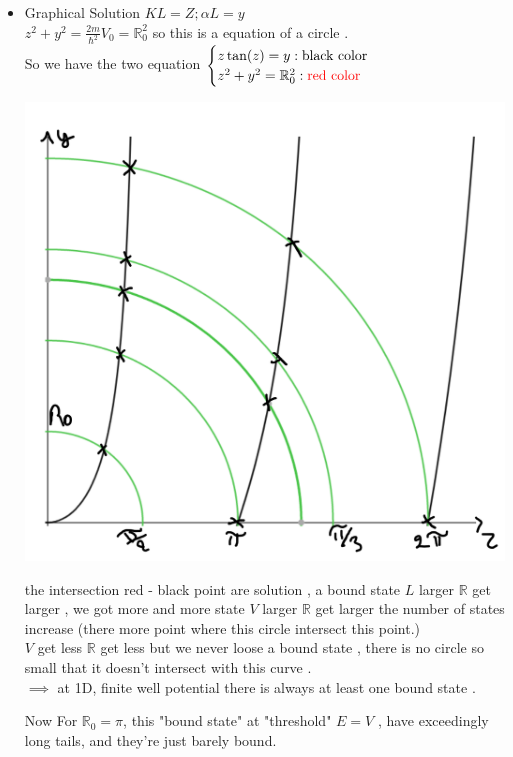 \documentclass[12pt,oneside]{book}
\begin{document}
\begin{itemize}
		\item Graphical Solution $KL = Z ; \alpha L = y$\\
			$z^2 + y^2 = \frac{2m}{\hbar^2}V_0 = \mathbb{R}_0^2$ so this is a equation of a circle . \\
			So we have the two equation $\begin{cases}
				z\tan(z) = y : \text{\textcolor{black}{black color}}\\
				z^2 + y^2 = \mathbb{R}_0^2 : \text{\textcolor{red}{red color}}
			\end{cases}$
			\begin{center}
				\includegraphics[width=0.5\linewidth]{../pic/3302/21.png}
			\end{center}
			the intersection red - black point are solution , a bound state
			$L$ larger $\mathbb{R}$ get larger , we got more and more state
			$V $ larger $\mathbb{R}$ get larger the number of states increase (there more point where this circle intersect this point.)\\
			$V$ get less $\mathbb{R}$ get less but we never loose a bound state , there is no circle so small that it doesn't intersect with this curve .\\
			$\implies $ at 1D, finite well potential there is always at least one  bound state .

			Now For $\mathbb{R}_0 = \pi $, this "bound state"  at "threshold" $E = V$ , have exceedingly long tails, and they're just barely bound.


\end{itemize}
\end{document}
